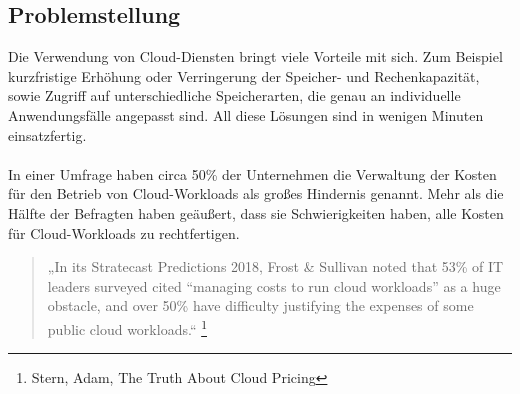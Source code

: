 \subsection{Problemstellung}
\begin{comment}
\\\\
”Heute hatten wir 17 Gäste für unsere derzeit 20 Zimmer. Für die kommende Messe am Wochenende sind wir bereit 500 Gäste zu empfangen. Nach der Messe werden wir mit unseren üblichen 20 Zimmern wie immer gut arbeiten können.”
Normalerweise bräuchte man eine große Investition zu machen, um solche kurzfristige Nachfrage zu erfüllen. Vergleichbar ist es bei traditionellen IT-Infrastrukturen, mehr Kapazitätsbedarf, würde die Anschaffung von einer neuen Hardware bedeuten.
\\\\
\end{comment}
Die Verwendung von Cloud-Diensten bringt viele Vorteile mit sich. Zum Beispiel kurzfristige Erhöhung oder Verringerung der Speicher- und Rechenkapazität, sowie Zugriff auf unterschiedliche Speicherarten, die genau an individuelle Anwendungsfälle angepasst sind. All diese Lösungen sind in wenigen Minuten einsatzfertig. 
\\\\
In einer Umfrage haben circa 50\% der Unternehmen die Verwaltung der Kosten für den Betrieb von Cloud-Workloads als großes Hindernis genannt. Mehr als die Hälfte der Befragten haben geäußert, dass sie Schwierigkeiten haben, alle Kosten für Cloud-Workloads zu rechtfertigen.
\begin{quote}
    „In its Stratecast Predictions 2018, Frost \& Sullivan noted that 53\% of IT leaders surveyed cited “managing costs to run cloud workloads” as a huge obstacle, and over 50\% have difficulty justifying the expenses of some public cloud workloads.“  
    \footnote{\cite{SP1}Stern, Adam, The Truth About Cloud Pricing}
    \end{quote}

